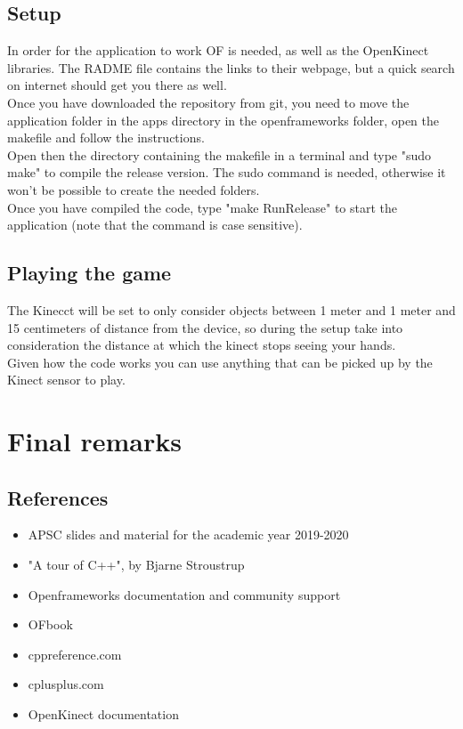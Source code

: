 \documentclass[]{article}
\begin{document}
\subsection{Setup}
In order for the application to work OF is needed, as well as the OpenKinect libraries. The RADME file contains the links to their webpage, but a quick search on internet should get you there as well.\\
Once you have downloaded the repository from git, you need to move the application folder in the apps directory in the openframeworks folder, open the makefile and follow the instructions.\\
Open then the directory containing the makefile in a terminal and type "sudo make" to compile the release version. The sudo command is needed, otherwise it won't be possible to create the needed folders.\\
Once you have compiled the code, type "make RunRelease" to start the application (note that the command is case sensitive).
\subsection{Playing the game}
The Kinecct will be set to only consider objects between 1 meter and 1 meter and 15 centimeters of distance from the device, so during the setup take into consideration the distance at which the kinect stops seeing your hands.\\
Given how the code works you can use anything that can be picked up by the Kinect sensor to play.

\newpage
\section{Final remarks}
\subsection{References}
\begin{itemize}
	\item APSC slides and material for the academic year 2019-2020
	\item "A tour of C++", by Bjarne Stroustrup
	\item Openframeworks documentation and community support
	\item OFbook
	\item cppreference.com
	\item cplusplus.com
	\item OpenKinect documentation
\end{itemize}
\end{document}
